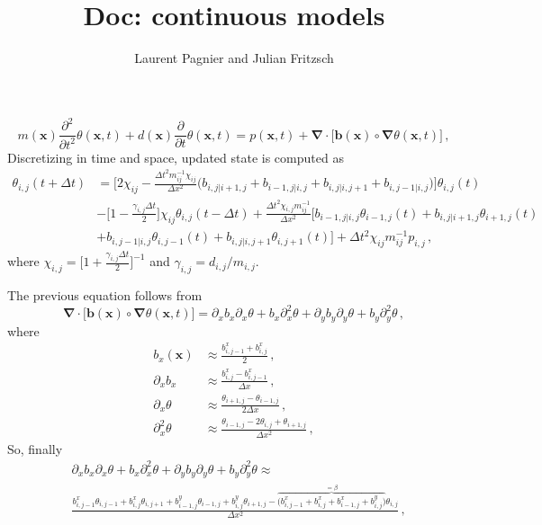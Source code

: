 \documentclass[notitlepage]{revtex4-2}
\begin{document}
\title{Doc: continuous models}
\author{Laurent Pagnier and Julian Fritzsch}
\maketitle

\begin{equation}
m(\bm x)\frac{\partial^2}{\partial t^2}\theta(\bm x,t)+d(\bm x)\frac{\partial}{\partial t}\theta(\bm x,t)=p(\bm x,t)+\bm\nabla\cdot\big[\bm b(\bm x)\circ\bm\nabla\theta(\bm x,t)\big]\,,
\end{equation}
Discretizing in time and space, updated state is computed as 
\begin{align}
\theta_{i,j}(t+\Delta t) &= 
\bigg[2\chi_{ij} -\frac{\Delta t^2 m_{ij}^{-1}\chi_{ij}}{\Delta x^2}\Big(b_{i,j|i+1,j}+b_{i-1,j|i,j}+b_{i,j|i,j+1}+b_{i,j-1|i,j}\Big)\bigg]\theta_{i,j}(t)\nonumber\\
&-\Big[1-\frac{\gamma_{i,j}\Delta t}{2}\Big]\chi_{ij}\theta_{i,j}(t-\Delta t) +\frac{\Delta t^2 \chi_{i,j}m_{ij}^{-1}}{\Delta x^2}\bigg[b_{i-1,j|i,j}\theta_{i-1,j}(t)+b_{i,j|i+1,j}\theta_{i+1,j}(t)\nonumber\\
&+b_{i,j-1|i,j}\theta_{i,j-1}(t)
+b_{i,j|i,j+1}\theta_{i,j+1}(t)\bigg] + \Delta t^2 \chi_{ij} m_{ij}^{-1}p_{i,j}\,,
\end{align}
where $\chi_{i,j}=\Big[1+\frac{\gamma_{i,j}\Delta t}{2}\Big]^{-1}$ and $\gamma_{i,j}=d_{i,j}/m_{i,j}$.

The previous equation follows from
\begin{equation}
\bm\nabla\cdot\big[\bm b(\bm x)\circ\bm\nabla\theta(\bm x,t)\big]=\partial_xb_x\partial_x\theta+b_x\partial_x^2\theta +\partial_yb_y\partial_y\theta+b_y\partial_y^2\theta\,,
\end{equation}
where
\begin{align}
b_x(\bm x)&\approx\frac{b^x_{i,j-1}+b^x_{i,j}}{2}\,,\\
\partial_xb_x&\approx\frac{b^x_{i,j}-b^x_{i,j-1}}{\Delta x}\,,\\
\partial_x\theta&\approx\frac{\theta_{i+1,j}-\theta_{i-1,j}}{2\Delta x}\,,\\
\partial_x^2\theta&\approx\frac{\theta_{i-1,j}-2\theta_{i,j}+\theta_{i+1,j}}{\Delta x^2}\,,
\end{align}
So, finally
\begin{align}
&\partial_xb_x\partial_x\theta+b_x\partial_x^2\theta +\partial_yb_y\partial_y\theta+b_y\partial_y^2\theta\approx\\
&\frac{b^x_{i,j-1}\theta_{i,j-1}+b^x_{i,j}\theta_{i,j+1}+b^y_{i-1,j}\theta_{i-1,j}+b^y_{i,j}\theta_{i+1,j}-\overbrace{\big(b^x_{i,j-1}+b^x_{i,j}+ b^x_{i-1,j}+b^y_{i,j}\big)}^{=\beta}\theta_{i,j}}{\Delta x^2}\,,
\end{align}
\end{document}
